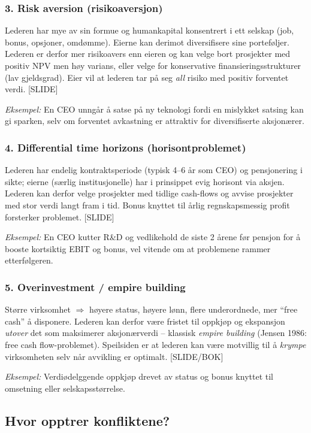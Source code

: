 \subsubsection*{3. Risk aversion (risikoaversjon)}
Lederen har mye av sin formue og humankapital konsentrert i ett selskap (job, bonus, opsjoner, omdømme). Eierne kan derimot diversifisere sine porteføljer. Lederen er derfor mer risikoavers enn eieren og kan velge bort prosjekter med positiv NPV men høy varians, eller velge for konservative finansieringsstrukturer (lav gjeldsgrad). Eier vil at lederen tar på seg \emph{all} risiko med positiv forventet verdi. [SLIDE]

\emph{Eksempel:} En CEO unngår å satse på ny teknologi fordi en mislykket satsing kan gi sparken, selv om forventet avkastning er attraktiv for diversifiserte aksjonærer.

\subsubsection*{4. Differential time horizons (horisontproblemet)}
Lederen har endelig kontraktsperiode (typisk 4--6 år som CEO) og pensjonering i sikte; eierne (særlig institusjonelle) har i prinsippet evig horisont via aksjen. Lederen kan derfor velge prosjekter med tidlige cash-flows og avvise prosjekter med stor verdi langt fram i tid. Bonus knyttet til årlig regnskapsmessig profit forsterker problemet. [SLIDE]

\emph{Eksempel:} En CEO kutter R\&D og vedlikehold de siste 2 årene før pensjon for å booste kortsiktig EBIT og bonus, vel vitende om at problemene rammer etterfølgeren.

\subsubsection*{5. Overinvestment / empire building}
Større virksomhet $\Rightarrow$ høyere status, høyere lønn, flere underordnede, mer ``free cash'' å disponere. Lederen kan derfor være fristet til oppkjøp og ekspansjon \emph{utover} det som maksimerer aksjonærverdi -- klassisk \emph{empire building} (Jensen 1986: free cash flow-problemet). Speilsiden er at lederen kan være motvillig til å \emph{krympe} virksomheten selv når avvikling er optimalt. [SLIDE/BOK]

\emph{Eksempel:} Verdi\-ødelggende oppkjøp drevet av status og bonus knyttet til omsetning eller selskapsstørrelse.

\subsection*{Hvor opptrer konfliktene?}

